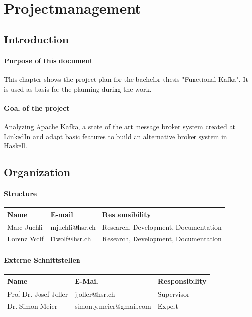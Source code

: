 \chapter{Projectmanagement}

\section*{Introduction}

\subsubsection*{Purpose of this document}
This chapter shows the project plan for the bachelor thesis "Functional Kafka".
It is used as basis for the planning during the work. 

\subsubsection*{Goal of the project}
Analyzing Apache Kafka, a state of the art message broker system created at
LinkedIn and adapt basic features to build an alternative broker system in
Haskell. 

\section*{Organization}

\subsubsection*{Structure}

\begin{tabular}[t]{|l|l|l|} \hline
\textbf{Name} & \textbf{E-mail} & \textbf{Responsibility} \\ \hline
Marc Juchli & mjuchli@hsr.ch & Research, Development, Documentation \\ \hline
Lorenz Wolf & l1wolf@hsr.ch & Research, Development, Documentation \\ \hline 
\end{tabular}

\subsubsection*{Externe Schnittstellen}

\begin{tabular}[t]{|l|l|l|} \hline
\textbf{Name} & \textbf{E-Mail} & \textbf{Responsibility}  \\ \hline
Prof Dr. Josef Joller & jjoller@hsr.ch & Supervisor \\ \hline 
Dr. Simon Meier & simon.y.meier@gmail.com & Expert  \\ \hline\end{tabular}

